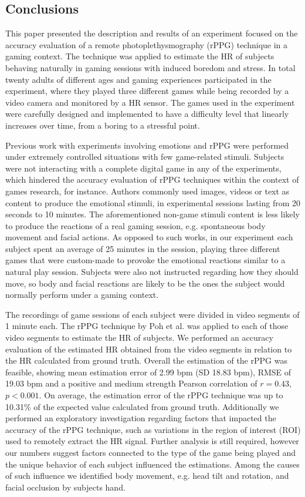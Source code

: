 \subsection{Conclusions}

This paper presented the description and results of an experiment focused on the accuracy evaluation of a remote photoplethysmography (rPPG) technique in a gaming context. The technique was applied to estimate the HR of subjects behaving naturally in gaming sessions with induced boredom and stress. In total twenty adults of different ages and gaming experiences participated in the experiment, where they played three different games while being recorded by a video camera and monitored by a HR sensor. The games used in the experiment were carefully designed and implemented to have a difficulty level that linearly increases over time, from a boring to a stressful point.

Previous work with experiments involving emotions and rPPG were performed under extremely controlled situations with few game-related stimuli. Subjects were not interacting with a complete digital game in any of the experiments, which hindered the accuracy evaluation of rPPG techniques within the context of games research, for instance. Authors commonly used images, videos or text as content to produce the emotional stimuli, in experimental sessions lasting from 20 seconds to 10 minutes. The aforementioned non-game stimuli content is less likely to produce the reactions of a real gaming session, e.g. spontaneous body movement and facial actions. As opposed to such works, in our experiment each subject spent an average of 25 minutes in the session, playing three different games that were custom-made to provoke the emotional reactions similar to a natural play session. Subjects were also not instructed regarding how they should move, so body and facial reactions are likely to be the ones the subject would normally perform under a gaming context.

The recordings of game sessions of each subject were divided in video segments of 1 minute each. The rPPG technique by Poh et al. \parencite{poh2011advancements} was applied to each of those video segments to estimate the HR of subjects. We performed an accuracy evaluation of the estimated HR obtained from the video segments in relation to the HR calculated from ground truth. Overall the estimation of the rPPG was feasible, showing mean estimation error of 2.99 bpm (SD 18.83 bpm), RMSE of 19.03 bpm and a positive and medium strength Pearson correlation of $r=0.43$, $p < 0.001$. On average, the estimation error of the rPPG technique was up to 10.31\% of the expected value calculated from ground truth. Additionally we performed an exploratory investigation regarding factors that impacted the accuracy of the rPPG technique, such as variations in the region of interest (ROI) used to remotely extract the HR signal. Further analysis is still required, however our numbers suggest factors connected to the type of the game being played and the unique behavior of each subject influenced the estimations. Among the causes of such influence we identified body movement, e.g. head tilt and rotation, and facial occlusion by subjects hand.

